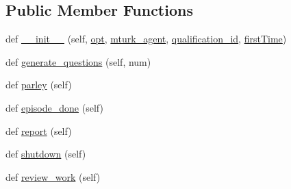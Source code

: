 \subsection*{Public Member Functions}
\begin{DoxyCompactItemize}
\item 
def \hyperlink{classparlai_1_1mturk_1_1tasks_1_1qualification__flow__example_1_1worlds_1_1QualificationFlowSoloWorld_a3d703ff5db42f79baaec3cd6e601edaf}{\+\_\+\+\_\+init\+\_\+\+\_\+} (self, \hyperlink{classparlai_1_1mturk_1_1tasks_1_1qualification__flow__example_1_1worlds_1_1QualificationFlowSoloWorld_aca37e756d5c9ef6ae9031b42ccc1ab75}{opt}, \hyperlink{classparlai_1_1mturk_1_1tasks_1_1qualification__flow__example_1_1worlds_1_1QualificationFlowSoloWorld_a3adec199df30efa7c83a6d92de25b1c1}{mturk\+\_\+agent}, \hyperlink{classparlai_1_1mturk_1_1tasks_1_1qualification__flow__example_1_1worlds_1_1QualificationFlowSoloWorld_a201c886bc3659ba6f4a59c6ea568b6f6}{qualification\+\_\+id}, \hyperlink{classparlai_1_1mturk_1_1tasks_1_1qualification__flow__example_1_1worlds_1_1QualificationFlowSoloWorld_a8078da8a5070aeb6a71f5fb04ce8a48e}{first\+Time})
\item 
def \hyperlink{classparlai_1_1mturk_1_1tasks_1_1qualification__flow__example_1_1worlds_1_1QualificationFlowSoloWorld_a12279c17c3aa6fd716f549a4c1c1c270}{generate\+\_\+questions} (self, num)
\item 
def \hyperlink{classparlai_1_1mturk_1_1tasks_1_1qualification__flow__example_1_1worlds_1_1QualificationFlowSoloWorld_a47ce01979febfd35c072cae4f92ecdba}{parley} (self)
\item 
def \hyperlink{classparlai_1_1mturk_1_1tasks_1_1qualification__flow__example_1_1worlds_1_1QualificationFlowSoloWorld_a59a02d55f0eeffb3e4d6710c443db3e8}{episode\+\_\+done} (self)
\item 
def \hyperlink{classparlai_1_1mturk_1_1tasks_1_1qualification__flow__example_1_1worlds_1_1QualificationFlowSoloWorld_a2e729506d1acc84ad4cf35bc5be02a0e}{report} (self)
\item 
def \hyperlink{classparlai_1_1mturk_1_1tasks_1_1qualification__flow__example_1_1worlds_1_1QualificationFlowSoloWorld_a869c8ed34266cc3bcafb88975172807e}{shutdown} (self)
\item 
def \hyperlink{classparlai_1_1mturk_1_1tasks_1_1qualification__flow__example_1_1worlds_1_1QualificationFlowSoloWorld_a66fdc76d86f2d1ff4dc6d30db75437fa}{review\+\_\+work} (self)
\end{DoxyCompactItemize}

